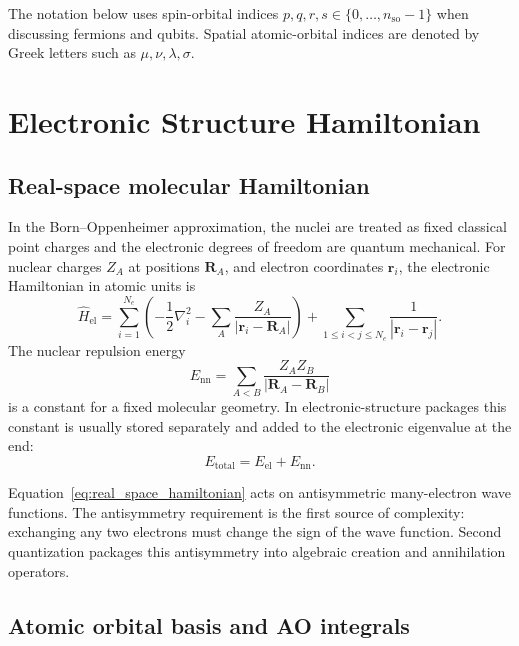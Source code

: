 \documentclass[11pt]{article}
\begin{document}
The notation below uses spin-orbital indices $p,q,r,s\in\{0,\ldots,n_{\mathrm{so}}-1\}$ when discussing fermions and qubits.  Spatial atomic-orbital indices are denoted by Greek letters such as $\mu,\nu,\lambda,\sigma$.

\section{Electronic Structure Hamiltonian}

\subsection{Real-space molecular Hamiltonian}

In the Born--Oppenheimer approximation, the nuclei are treated as fixed classical point charges and the electronic degrees of freedom are quantum mechanical.  For nuclear charges $Z_A$ at positions $\mathbf{R}_A$, and electron coordinates $\mathbf{r}_i$, the electronic Hamiltonian in atomic units is
\begin{equation}
    \hat{H}_{\mathrm{el}}
    = \sum_{i=1}^{N_e}
    \left(
        -\frac{1}{2}\nabla_i^2
        - \sum_A \frac{Z_A}{|\mathbf{r}_i-\mathbf{R}_A|}
    \right)
    + \sum_{1\leq i<j\leq N_e}\frac{1}{|\mathbf{r}_i-\mathbf{r}_j|}.
    \label{eq:real_space_hamiltonian}
\end{equation}
The nuclear repulsion energy
\begin{equation}
    E_{\mathrm{nn}}=\sum_{A<B}\frac{Z_AZ_B}{|\mathbf{R}_A-\mathbf{R}_B|}
\end{equation}
is a constant for a fixed molecular geometry.  In electronic-structure packages this constant is usually stored separately and added to the electronic eigenvalue at the end:
\begin{equation}
    E_{\mathrm{total}} = E_{\mathrm{el}} + E_{\mathrm{nn}}.
\end{equation}

Equation~\eqref{eq:real_space_hamiltonian} acts on antisymmetric many-electron wave functions.  The antisymmetry requirement is the first source of complexity: exchanging any two electrons must change the sign of the wave function.  Second quantization packages this antisymmetry into algebraic creation and annihilation operators.

\subsection{Atomic orbital basis and AO integrals}
\end{document}
